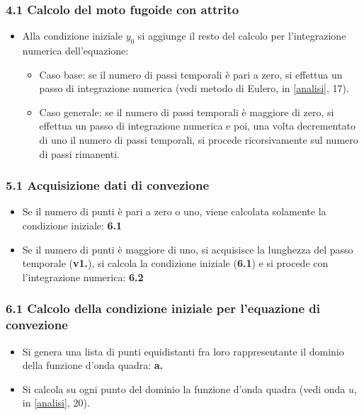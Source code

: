 \subsubsection*{4.1 Calcolo del moto fugoide con attrito}
\begin{itemize}
\item Alla condizione iniziale $y_0$ si aggiunge il resto del calcolo per l'integrazione numerica dell'equazione:
\begin{itemize}
\item Caso base: se il numero di passi temporali è pari a zero, si effettua un passo di integrazione numerica (vedi metodo di Eulero, in \ref{analisi}, 17).
\item Caso generale: se il numero di passi temporali è maggiore di zero, si effettua un passo di integrazione numerica e poi, una volta decrementato di uno il numero di passi temporali, si procede ricorsivamente sul numero di passi rimanenti. 
\end{itemize}
\end{itemize}

\subsubsection*{5.1 Acquisizione dati di convezione}
\begin{itemize}
\item Se il numero di punti è pari a zero o uno, viene calcolata solamente la condizione iniziale: \textbf{6.1}
\item Se il numero di punti è maggiore di uno, si acquisisce la lunghezza del passo temporale (\textbf{v1.}), si calcola la condizione iniziale (\textbf{6.1}) e si procede con l'integrazione numerica: \textbf{6.2} 
\end{itemize}

\subsubsection*{6.1 Calcolo della condizione iniziale per l'equazione di convezione}
\begin{itemize}
\item Si genera una lista di punti equidistanti fra loro rappresentante il dominio della funzione d'onda quadra: \textbf{a.} 
\item Si calcola su ogni punto del dominio la funzione d'onda quadra (vedi onda $u$, in \ref{analisi}, 20). 
\end{itemize}

